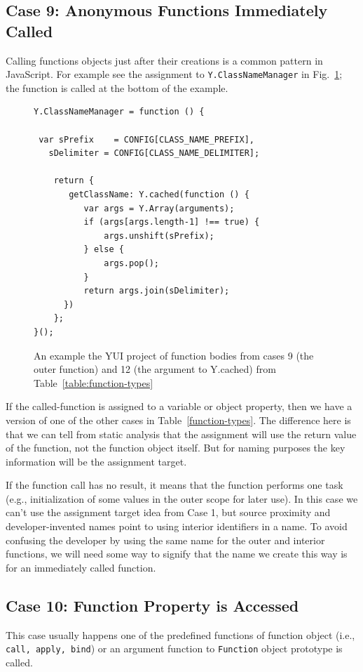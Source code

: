\documentclass[10pt, preprint]{sigplanconf}
\begin{document}
\subsection{Case 9: Anonymous Functions Immediately Called}
Calling functions objects just after their creations is a common pattern in JavaScript. For example see the assignment to \verb|Y.ClassNameManager| in Fig.~\ref{fig:classnamemanager}; the function is called at the bottom of the example. 
\begin{figure}[htp]
\begin{verbatim}
Y.ClassNameManager = function () {

 var sPrefix    = CONFIG[CLASS_NAME_PREFIX],
   sDelimiter = CONFIG[CLASS_NAME_DELIMITER];

    return {
       getClassName: Y.cached(function () {
          var args = Y.Array(arguments);
          if (args[args.length-1] !== true) {
              args.unshift(sPrefix);
          } else {
              args.pop();
          }
          return args.join(sDelimiter);
      })
    };
}();
\end{verbatim}
\label{fig:classnamemanager}
\caption{An example the YUI project of function bodies from cases 9 (the outer function)  and 12  (the argument to Y.cached) from Table~\ref{table:function-types}  }
\end{figure}

If the called-function is assigned to a variable or object property, then we have a version of one of the other cases in Table~\ref{function-types}. The difference here is that we can tell from static analysis that the assignment will use the return value of the function, not the function object itself. But for naming purposes the key information will be the assignment target.

If the function call has no result, it means that the function performs one task (e.g., initialization of some values in the outer scope for later use). In this case we can't use the assignment target idea from Case 1, but source proximity and developer-invented names point to using interior identifiers in a name. To avoid confusing the developer by using the same name for the outer and interior functions, we will need some way to signify that the name we create this way is for an immediately called function.

\subsection{Case 10: Function Property is Accessed}
This case usually happens one of the predefined functions of function object (i.e., {\small\texttt{call, apply, bind}}) or an argument function to {\small\texttt{Function}} object prototype is called.
\end{document}
